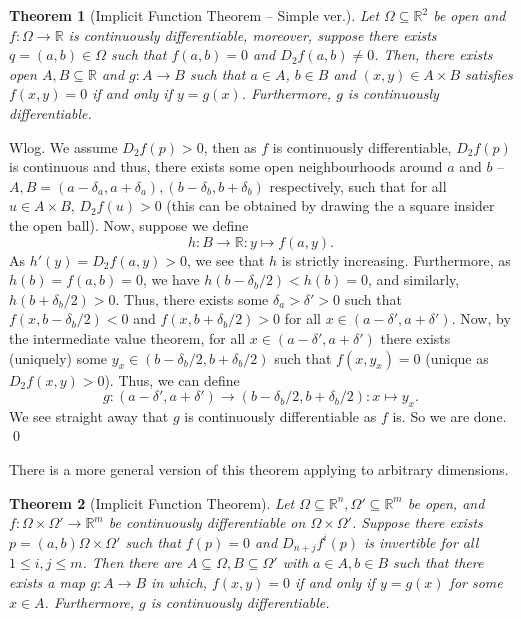 \documentclass[
]{article}
\newtheorem{theorem}{Theorem}
\theoremstyle{definition}
\begin{document}
\begin{theorem}[Implicit Function Theorem -- Simple ver.]
  Let \(\Omega \subseteq \mathbb{R}^2\) be open and \(f : \Omega \to \mathbb{R}\) 
  is continuously differentiable, moreover, suppose there exists 
  \(q = (a, b) \in \Omega\) such that \(f(a, b) = 0\) and \(D_2 f(a, b) \neq 0\). 
  Then, there exists open \(A, B \subseteq \mathbb{R}\) and \(g : A \to B\)
   such that \(a \in A\), \(b \in B\) and \((x, y) \in A \times B\) satisfies 
   \(f(x, y) = 0\) if and only if \(y = g(x)\). Furthermore, \(g\) is 
   continuously differentiable.
\end{theorem}

\proof

Wlog. We assume \(D_2f(p) > 0\), then as \(f\) is continuously
differentiable, \(D_2f(p)\) is continuous and thus, there exists some
open neighbourhoods around \(a\) and \(b\) --
\(A, B = (a - \delta_a, a + \delta_a), (b - \delta_b, b + \delta_b)\)
respectively, such that for all \(u \in A \times B\), \(D_2f(u) > 0\)
(this can be obtained by drawing the a square insider the open ball).
Now, suppose we define \[h : B \to \mathbb{R} : y \mapsto f(a, y).\] As
\(h'(y) = D_2f(a, y) > 0\), we see that \(h\) is strictly increasing.
Furthermore, as \(h(b) = f(a, b) = 0\), we have
\(h(b - \delta_b / 2) < h(b) = 0\), and similarly,
\(h(b + \delta_b / 2) > 0\). Thus, there exists some
\(\delta_a > \delta' > 0\) such that \(f(x, b - \delta_b / 2) < 0\) and
\(f(x, b + \delta_b / 2) > 0\) for all
\(x \in (a - \delta', a + \delta')\). Now, by the intermediate value
theorem, for all \(x \in (a - \delta', a + \delta')\) there exists
(uniquely) some \(y_x \in (b - \delta_b / 2, b + \delta_b / 2)\) such
that \(f(x, y_x) = 0\) (unique as \(D_2f(x, y) > 0\)). Thus, we can
define
\[g : (a - \delta', a + \delta') \to (b - \delta_b / 2, b + \delta_b / 2) : x \mapsto y_x.\]
We see straight away that \(g\) is continuously differentiable as \(f\)
is. So we are done. \qed

There is a more general version of this theorem applying to arbitrary
dimensions.

\begin{theorem}[Implicit Function Theorem]
  Let \(\Omega \subseteq \mathbb{R}^n, \Omega' \subseteq \mathbb{R}^m\) be open, 
  and \(f : \Omega \times \Omega' \to \mathbb{R}^m\) be continuously differentiable 
  on \(\Omega \times \Omega'\). Suppose there exists 
  \(p = (a, b) \Omega \times \Omega'\) such that \(f(p) = 0\) and 
  \(D_{n + j} f^i(p)\) is invertible for all \(1 \le i, j \le m\). Then there 
  are \(A \subseteq \Omega, B \subseteq \Omega'\) with \(a \in A, b \in B\) 
  such that there exists a map \(g : A \to B\) in which, 
  \(f(x, y) = 0\) if and only if \(y = g(x)\) for some \(x \in A\).
  Furthermore, \(g\) is continuously differentiable.
\end{theorem}
\end{document}
